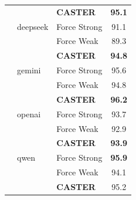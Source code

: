 \documentclass{article}
\theoremstyle{plain}
\theoremstyle{definition}
\theoremstyle{remark}
\begin{document}
\begin{table}[t]
\begin{minipage}{0.48\textwidth}
{\begin{tabular}{lllc}
         &  & \textbf{CASTER} & \textbf{95.1} \\
         & deepseek & Force Strong& 91.1 \\
         &  & Force Weak& 89.3 \\
         &  & \textbf{CASTER} & \textbf{94.8} \\
         & gemini & Force Strong& 95.6\\
         &  & Force Weak& 94.8\\
         &  & \textbf{CASTER} & \textbf{96.2}\\
         & openai & Force Strong& 93.7 \\
         &  & Force Weak& 92.9 \\
         &  & \textbf{CASTER} & \textbf{93.9} \\
         & qwen & Force Strong& \textbf{95.9} \\
         &  & Force Weak& 94.1\\
         &  & \textbf{CASTER} & 95.2 \\
            \bottomrule
        \end{tabular}%
        }
    \end{minipage}
\end{table}

\end{document}
